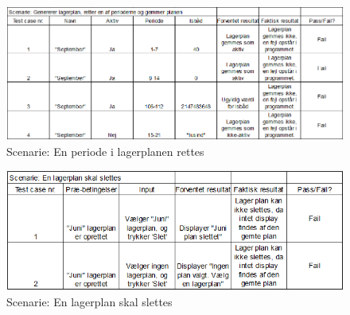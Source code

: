 \begin{figure}[p]
    \centering
    \includegraphics[width=0.7\hsize]{figures/tests/test_ret_plan.png}
    \caption{Scenarie: En periode i lagerplanen rettes}
    \label{fig:testeditperiod}
\end{figure}

\begin{figure}[h]
    \centering
    \includegraphics[width=0.7\hsize]{figures/tests/test_slet_lagerplan.png}
    \caption{Scenarie: En lagerplan skal slettes}
    \label{fig:testdelete}
\end{figure}
